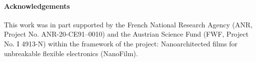 \paragraph{Acknowledgements} This work was in part supported by the French National Research Agency (ANR, Project No. ANR-20-CE91–0010) and the Austrian Science Fund (FWF, Project No. I 4913-N) within the framework of the project: Nanoarchitected films for unbreakable flexible electronics (NanoFilm).



